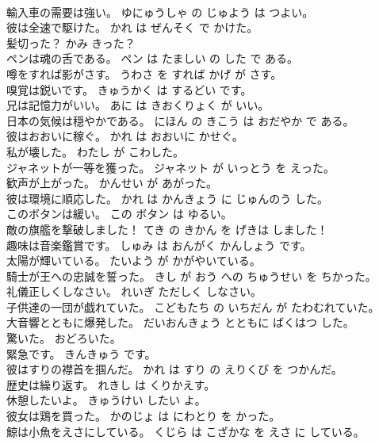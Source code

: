 \documentclass[8pt]{extreport}
\begin{document}
\begin{CJK}{UTF8}{min}
\\	輸入車の需要は強い。	ゆにゅうしゃ の じゅよう は つよい。	
\\	彼は全速で駆けた。	かれ は ぜんそく で かけた。	
\\	髪切った？	かみ きった？	
\\	ペンは魂の舌である。	ペン は たましい の した で ある。	
\\	噂をすれば影がさす。	うわさ を すれば かげ が さす。	
\\	嗅覚は鋭いです。	きゅうかく は するどい です。	
\\	兄は記憶力がいい。	あに は きおくりょく が いい。	
\\	日本の気候は穏やかである。	にほん の きこう は おだやか で ある。	
\\	彼はおおいに稼ぐ。	かれ は おおいに かせぐ。	
\\	私が壊した。	わたし が こわした。	
\\	ジャネットが一等を獲った。	ジャネット が いっとう を えった。	
\\	歓声が上がった。	かんせい が あがった。	
\\	彼は環境に順応した。	かれ は かんきょう に じゅんのう した。	
\\	このボタンは緩い。	この ボタン は ゆるい。	
\\	敵の旗艦を撃破しました！	てき の きかん を げきは しました！	
\\	趣味は音楽鑑賞です。	しゅみ は おんがく かんしょう です。	
\\	太陽が輝いている。	たいよう が かがやいている。	
\\	騎士が王への忠誠を誓った。	きし が おう への ちゅうせい を ちかった。	
\\	礼儀正しくしなさい。	れいぎ ただしく しなさい。	
\\	子供達の一団が戯れていた。	こどもたち の いちだん が たわむれていた。	
\\	大音響とともに爆発した。	だいおんきょう とともに ばくはつ した。	
\\	驚いた。	おどろいた。	
\\	緊急です。	きんきゅう です。	
\\	彼はすりの襟首を掴んだ。	かれ は すり の えりくび を つかんだ。	
\\	歴史は繰り返す。	れきし は くりかえす。	
\\	休憩したいよ。	きゅうけい したい よ。	
\\	彼女は鶏を買った。	かのじょ は にわとり を かった。	
\\	鯨は小魚をえさにしている。	くじら は こざかな を えさ に している。	

\end{CJK}
\end{document}

